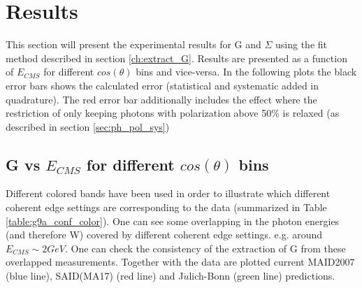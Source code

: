 \section{Results}
This section will present the experimental results for G and $\Sigma$ using the fit method described in section \ref{ch:extract_G}. 
Results are presented as a function of $E_{CMS}$ for different $cos(\theta)$ bins and vice-versa. 
In the following plots the black error bars shows the calculated error (statistical and systematic added in quadrature). The red error bar additionally includes the effect where the restriction of only keeping photons with polarization above 50\% is relaxed (as described in section \ref{sec:ph_pol_sys})



\subsection{G vs \texorpdfstring{$E_{CMS}$}{E-CMS} for different \texorpdfstring{$cos(\theta)$}{cos(theta)} bins}\label{ch:result_W}
Different colored bands have been used in order to illustrate which different coherent edge settings are corresponding to the data (summarized in Table \ref{table:g9a_conf_color}). One can see some overlapping in the photon energies (and therefore W) covered by different coherent edge settings. e.g.  around $E_{CMS} \sim 2 GeV$. One can check the consistency of the extraction of G from these overlapped measurements. Together with the data are plotted current MAID2007 \cite{MAID_2007} (blue line), SAID(MA17) \cite{PhysRevC.96.035204} (red line) and J$\ddot{u}$lich-Bonn \cite{Ronchen:2018ury} (green line)  predictions.
